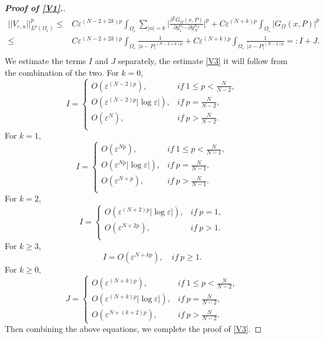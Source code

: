 \documentclass[11pt,reqno]{article}
\numberwithin{equation}{section}
\newcommand\e\varepsilon
\renewcommand\O\Omega
\begin{document}
\begin{proof}[\bf Proof of \eqref{V1}.]
				\begin{equation}
                \begin{aligned}
					||V_{\e,u}||_{L^p(\O_\e)}^p\le& C\e^{(N-2+2k)p}\int_{\O_\e}\sum_{|\alpha|=k}\Big|\frac{\partial^kG_{\Omega}(x,P)}{\partial y_1^{\alpha_1}\cdots\partial y_N^{\alpha_N}}\Big|^p +C\e^{(N+k)p}
					\int_{\O_\e}|G_{\Omega}(x,P)|^p\\
                    \le & C\e^{(N-2+2k)p}\int_{\O_\e} \frac{1}{|x-P|^{(N-2+k)p}}+C\e^{(N+k)p}
					\int_{\O_\e}\frac1{|x-P|^{(N-2)p}}=:I+J.\\
                     \end{aligned}
				\end{equation}
				 We estimate the terms $I$ and $J$ separately, the estimate \eqref{V3} it will follow from the combination of the two. For $k=0$,
				\begin{equation}
					I=
					\begin{cases}
						O(\e^{(N-2)p}),  &if\ 1\le p<\frac N{N-2},\\
						O(\e^{(N-2)p}|\log\e|), &if\  p=\frac{N}{N-2},\\
						O(\e^{N}),   &if\  p>\frac{N}{N-2}.\\
					\end{cases}
				\end{equation}
				For $k=1$,
				\begin{equation}
					I=
					\begin{cases}
						O(\e^{Np}),  &if\ 1\le p<\frac N{N-1},\\
						O(\e^{Np}|\log\e|), &if\  p=\frac{N}{N-1},\\
						O(\e^{N+p}),   &if\  p>\frac{N}{N-1}.\\
					\end{cases}
				\end{equation}
				For $k= 2$,
				\begin{equation}
					I=
					\begin{cases}
						O(\e^{(N+2)p}|\log\e|), &if\  p=1,\\
						O(\e^{N+2p}),   &if\  p>1.\\
					\end{cases}
				\end{equation}
				For $k\ge 3$,
				\begin{equation}
					I=	O(\e^{N+kp}),\quad if \ p\ge 1.
				\end{equation}
                For $k\ge 0$, 
				\begin{equation}
					J=
					\begin{cases}
						O(\e^{(N+k)p}),&if\ 1\le p<\frac N{N-2},\\
						O(\e^{(N+k)p}|\log\e|),&if\  p=\frac N{N-2},\\
						O(\e^{N+(k+2)p}),&if\ p>\frac N{N-2}.
					\end{cases}
				\end{equation}
                Then combining the above equations, we complete the proof of  \eqref{V3}.
				\end{proof} 	   	 
\end{document}
